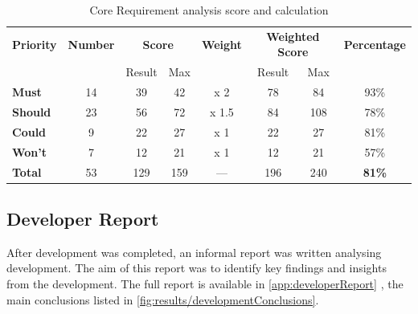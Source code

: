 \begin{table}[H]
    \centering
    \begin{tabular}{|l|c|cc|c|cc|c|}\hline
        \textbf{Priority}& \textbf{Number}& \multicolumn{2}{c|}{\textbf{Score}} & \textbf{Weight}& \multicolumn{2}{c|}{\textbf{Weighted Score}}&\textbf{Percentage}\\
        & & Result & Max & & Result & Max & \\\hline
        \textbf{Must}   & 14 &  39 &  42 & x 2   &  78 &  84 & 93\% \\
        \textbf{Should} & 23 &  56 &  72 & x 1.5 &  84 & 108 & 78\% \\
        \textbf{Could}  &  9 &  22 &  27 & x 1   &  22 &  27 & 81\% \\
        \textbf{Won't}  &  7 &  12 &  21 & x 1   &  12 &  21 & 57\% \\ \hline
        \textbf{Total}  & 53 & 129 & 159 &   --- & 196 & 240 & \textbf{81\%} \\ \hline
    \end{tabular}
    \caption{Core Requirement analysis score and calculation}
    \label{ReqAnalysisResults}
\end{table}

\subsection{Developer Report}
After development was completed, an informal report was written analysing development. The aim of this report was to identify key findings and insights from the development. The full report is available in \autoref{app:developerReport} , the main conclusions listed in \autoref{fig:results/developmentConclusions}.

